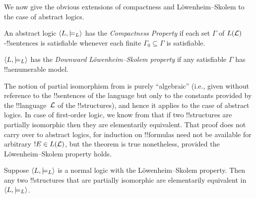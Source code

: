 \documentclass[../../../include/open-logic-section]{subfiles}
\begin{document}


We now give the obvious extensions of compactness and
L\"owenheim--Skolem to the case of abstract logics.

\begin{defn}
An abstract logic $\langle L, \models_L \rangle$ has the \emph{Compactness
  Property} if each set $\Gamma$ of $L(\Lang{L})$-!!{sentence}s is
satisfiable whenever each finite $\Gamma_0 \subseteq \Gamma$ is
satisfiable.
\end{defn}

\begin{defn}
$\langle L, \models_L \rangle$ has the \emph{Downward L\"owenheim--Skolem
  property} if any satisfiable $\Gamma$ has !!a{enumerable} model.
\end{defn}


The notion of partial isomorphism from
 is purely ``algebraic'' (i.e.,
given without reference to the !!{sentence}s of the language but only
to the constants provided by the !!{language}~$\Lang{L}$ of the
!!{structure}s), and hence it applies to the case of abstract
logics. In case of first-order logic, we know from
 that if two !!{structure}s are partially
isomorphic then they are elementarily equivalent. That proof does not
carry over to abstract logics, for induction on !!{formula}s need not
be available for arbitrary $!E \in L(\Lang{L})$, but the theorem is
true nonetheless, provided the L\"owenheim--Skolem property holds.

\begin{thm}
Suppose $\langle L, \models_L \rangle$ is a normal logic with the
L\"owenheim--Skolem property. Then any two !!{structure}s that are
partially isomorphic are elementarily equivalent in $\langle L,
  \models_L \rangle$.
\end{thm}
\end{document}
